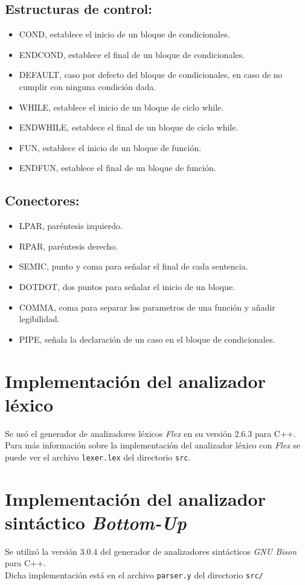 \documentclass[12pt]{article}
\begin{document}
\subsection{Estructuras de control:}
\begin{itemize}
 	\item COND, establece el inicio de un bloque de condicionales.
    \item ENDCOND, establece el final de un bloque de condicionales.
    \item DEFAULT, caso por defecto del bloque de condicionales, en caso de no cumplir con ninguna condición dada.
    \item WHILE, establece el inicio de un bloque de ciclo while.
    \item ENDWHILE, establece el final de un bloque de ciclo while.
    \item FUN, establece el inicio de un bloque de función.
    \item ENDFUN, establece el final de un bloque de función.
\end{itemize}
    \subsection{Conectores:}
    \begin{itemize}
 	\item LPAR, paréntesis izquierdo.
    \item RPAR, paréntesis derecho.
    \item SEMIC, punto y coma para señalar el final de cada sentencia.
    \item DOTDOT, dos puntos para señalar el inicio de un bloque.
    \item COMMA, coma para separar los parametros de una función y añadir legibilidad.
    \item PIPE, señala la declaración de un caso en el bloque de condicionales.
\end{itemize}


\section{Implementación del analizador léxico}
Se usó el generador de analizadores léxicos \textit{Flex} en su versión 2.6.3 para C++. \\
Para más información sobre la implementación del analizador léxico con \textit{Flex} se puede ver el archivo \texttt{lexer.lex} del directorio \texttt{src}.\\
\section{Implementación del analizador sintáctico \textit{Bottom-Up}}
Se utilizó la versión 3.0.4 del generador de analizadores sintácticos \textit{GNU Bison} para C++. \\
Dicha implementación está en el archivo \texttt{parser.y} del directorio \texttt{src/}
\end{document}
